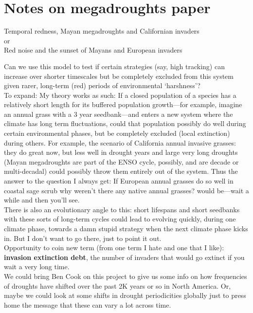 \documentclass[11pt,a4paper,oneside]{article}
\begin{document}
\newpage
\section{Notes on megadroughts paper}\label{mayannotes}
\begin{center}
{\Large Temporal redness, Mayan megadroughts and Californian invaders\\ or\\ Red noise and the sunset of Mayans and European invaders}
\end{center}

\noindent Can we use this model to test if certain strategies (say, high tracking) can increase over shorter timescales but be completely excluded from this system given rarer, long-term (red) periods of environmental `harshness'?\\

To expand: My theory works as such: If a closed population of a species has a relatively short length for its buffered population growth---for example, imagine an annual grass with a 3 year seedbank---and enters a new system where the climate has long term fluctuations, could that population possibly do well during certain environmental phases, but be completely excluded (local extinction) during others. For example, the scenario of California annual invasive grasses: they do great now, but less well in drought years and large very long droughts (Mayan megadroughts are part of the ENSO cycle, possibly, and are decade or multi-decadal) could possibly throw them entirely out of the system. Thus the answer to the question I always get: If European annual grasses do so well in coastal sage scrub why weren't there any native annual grasses? would be---wait a while and  then you'll see. \\

There is also an evolutionary angle to this: short lifespans and short seedbanks with these sorts of long-term cycles could lead to evolving quickly, during one climate phase, towards a damn stupid strategy when the next climate phase kicks in. But I don't want to go there, just to point it out.\\

\noindent Opportunity to coin new term (from one term I hate and one that I like): {\bf invasion extinction debt}, the number of invaders that would go extinct if you wait a very long time. \\

\noindent We could bring Ben Cook on this project to give us some info on how frequencies of droughts have shifted over the past 2K years or so in North America. Or, maybe we could look at some shifts in drought periodicities globally just to press home the message that these can vary a lot across time. \\
\end{document}
